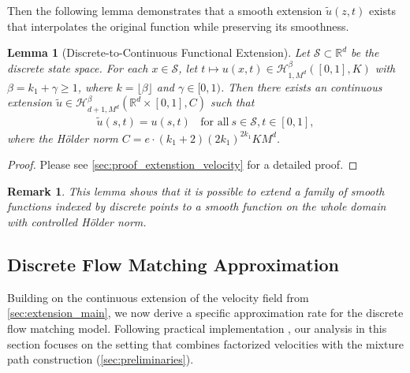 \documentclass[12pt]{article}
\numberwithin{equation}{section}
\let\tilde\widetilde
\newcommand{\wt}{\widetilde}
\renewcommand{\tilde}{\wt}
\def\R{\mathbb{R}}
\let\cite\citep
\theoremstyle{theoremstyle}
\newtheorem{lemma}{Lemma}[section]
\newtheorem{remark}{Remark}[section]
\numberwithin{equation}{section}
\numberwithin{theorem}{section}
\numberwithin{proposition}{section}
\numberwithin{definition}{section}
\numberwithin{lemma}{section}
\numberwithin{assumption}{section}
\numberwithin{remark}{section}
\begin{document}
Then the following lemma demonstrates that a smooth extension $\tilde{u}(z,t)$ exists that interpolates the original function while preserving its smoothness.



\begin{lemma}[Discrete-to-Continuous Functional Extension]
\label{lem:bridge_gap_from_discrete_to_continuous}
Let $\mathcal{S} \subset \R^d$ be the discrete state space.
For each $x\in\mathcal{S}$, 
let $t \mapsto u(x,t) \in \mathcal{H}^\beta_{1,M^d}([0,1],K)$ with $\beta=k_1+\gamma\ge 1$, where  $k=\lfloor \beta \rfloor$ and $\gamma\in[0,1)$.  
Then there exists an continuous extension $\tilde{u} \in \mathcal{H}^{\beta}_{d+1,M^d}(\R^{d}\times[0,1],C)$  such that
\begin{align*}
    \tilde{u}(s,t)=u(s,t) ~~~~\text{for all}~ s\in\mathcal{S}, t\in[0,1],
\end{align*}
where the H\"older norm $C = e\cdot(k_1+2)(2k_1)^{2k_1} KM^d$.
\end{lemma}
\begin{proof}
    Please see \cref{sec:proof_extenstion_velocity} for a detailed proof.
\end{proof}

\begin{remark}
    This lemma shows that it is possible to extend a family of smooth functions indexed by discrete points to a smooth function on the whole domain with controlled H\"older norm.
\end{remark}


\vspace{-1mm}
\subsection{Discrete Flow Matching Approximation}
\label{sec:dfm_approximation}
\vspace{-1mm}

Building on the continuous extension of the velocity field from \cref{sec:extension_main}, we now derive a specific approximation rate for the discrete flow matching model. 
Following practical implementation \cite{campbell2024generative,gat2024discrete,lipman2024flow}, our analysis in this section focuses on the setting that combines factorized velocities with the mixture path construction (\cref{sec:preliminaries}). 
\end{document}
